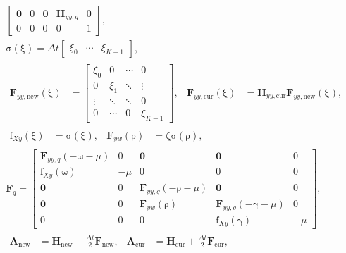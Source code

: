 \documentclass[USenglish]{article}
\renewcommand{\vec}[1]{\boldsymbol{\mathrm{#1}}}
\newcommand{\mat}[1]{\mathbf{#1}}
\begin{document}
\begin{subequations}
\begin{gather}
\begin{bmatrix}
      \mat{0} & \vec{0} & \mat{0} & \mat{H}_{yy, q} & \vec{0}
      \\
      \vec{0} & 0 & \vec{0} & \vec{0} & 1
    \end{bmatrix},
    \\
    \vec{\sigma}(\vec{\xi}) =
    \Delta t
    \begin{bmatrix}
      \xi_0 & \cdots & \xi_{K - 1}
    \end{bmatrix},
    \\
    \begin{aligned}
      \mat{F}_{yy, \mathrm{new}}(\vec{\xi}) &=
      \begin{bmatrix}
        \xi_0 & 0 & \cdots & 0 \\
        0 & \xi_1 & \ddots & \vdots \\
        \vdots & \ddots & \ddots & 0 \\
        0 & \cdots & 0 & \xi_{K - 1}
      \end{bmatrix},
      &
      \mat{F}_{yy, \mathrm{cur}}(\vec{\xi}) &=
      \mat{H}_{yy, \mathrm{cur}} \mat{F}_{yy, \mathrm{new}}(\vec{\xi}),
    \end{aligned}
    \\
    \begin{aligned}
      \vec{f}_{Xy}(\vec{\xi}) &= \vec{\sigma}(\vec{\xi}),
      &
      \mat{F}_{yw}(\vec{\rho}) &= \vec{\zeta} \vec{\sigma}(\vec{\rho}),
    \end{aligned}
    \\
    \mat{F}_q =
    \begin{bmatrix}
      \mat{F}_{yy, q}(- \vec{\omega} - \mu) & \vec{0} & \mat{0}
      & \mat{0} & \vec{0}
      \\
      \vec{f}_{Xy}(\vec{\omega}) & - \mu & \vec{0} & \vec{0} & 0
      \\
      \mat{0} & \vec{0} & \mat{F}_{yy, q}(- \vec{\rho} - \mu)
      & \mat{0} & \vec{0}
      \\
      \mat{0} & \vec{0} & \mat{F}_{yw}(\vec{\rho})
      & \mat{F}_{yy, q}(- \vec{\gamma} - \mu) & \vec{0}
      \\
      \vec{0} & 0 & \vec{0} & \vec{f}_{Xy}(\vec{\gamma}) & - \mu
    \end{bmatrix},
    \\
    \begin{aligned}
      \mat{A}_{\mathrm{new}} &=
      \mat{H}_{\mathrm{new}} - \frac{\Delta t}{2} \mat{F}_{\mathrm{new}},
      &
      \mat{A}_{\mathrm{cur}} &=
      \mat{H}_{\mathrm{cur}} + \frac{\Delta t}{2} \mat{F}_{\mathrm{cur}},

\end{aligned}
\end{gather}
\end{subequations}
\end{document}

